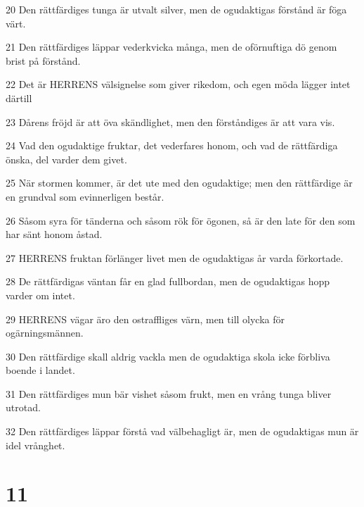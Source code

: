 \par 20 Den rättfärdiges tunga är utvalt silver, men de ogudaktigas förstånd är föga värt.
\par 21 Den rättfärdiges läppar vederkvicka många, men de oförnuftiga dö genom brist på förstånd.
\par 22 Det är HERRENS välsignelse som giver rikedom, och egen möda lägger intet därtill
\par 23 Dårens fröjd är att öva skändlighet, men den förståndiges är att vara vis.
\par 24 Vad den ogudaktige fruktar, det vederfares honom, och vad de rättfärdiga önska, del varder dem givet.
\par 25 När stormen kommer, är det ute med den ogudaktige; men den rättfärdige är en grundval som evinnerligen består.
\par 26 Såsom syra för tänderna och såsom rök för ögonen, så är den late för den som har sänt honom åstad.
\par 27 HERRENS fruktan förlänger livet men de ogudaktigas år varda förkortade.
\par 28 De rättfärdigas väntan får en glad fullbordan, men de ogudaktigas hopp varder om intet.
\par 29 HERRENS vägar äro den ostraffliges värn, men till olycka för ogärningsmännen.
\par 30 Den rättfärdige skall aldrig vackla men de ogudaktiga skola icke förbliva boende i landet.
\par 31 Den rättfärdiges mun bär vishet såsom frukt, men en vrång tunga bliver utrotad.
\par 32 Den rättfärdiges läppar förstå vad välbehagligt är, men de ogudaktigas mun är idel vrånghet.

\chapter{11}


